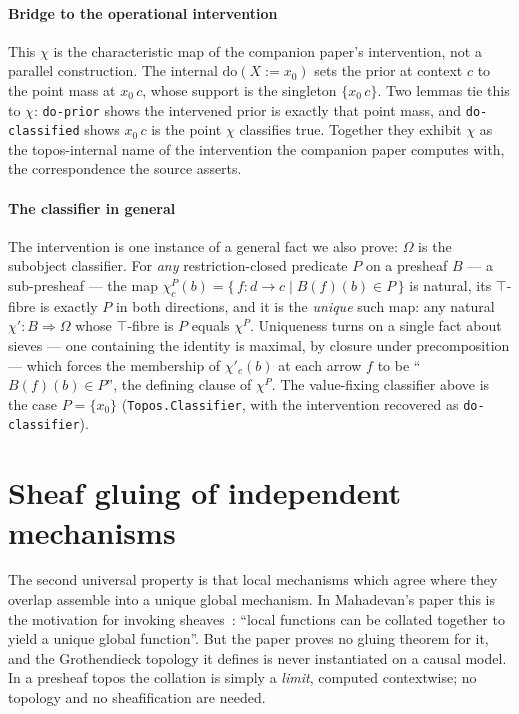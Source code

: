 \documentclass{lmcs}
\newcommand{\Om}{\Omega}
\newcommand{\dom}[2]{\mathrm{do}(#1\!:=\!#2)}
\begin{document}
\paragraph{Bridge to the operational intervention}
This $\chi$ is the characteristic map of the companion paper's intervention, not a parallel construction.
The internal $\dom{X}{x_0}$ sets the prior at context $c$ to the point mass at $x_0\,c$, whose support is the singleton $\{x_0\,c\}$.
Two lemmas tie this to $\chi$: \texttt{do-prior} shows the intervened prior is exactly that point mass, and \texttt{do-classified} shows $x_0\,c$ is the point $\chi$ classifies true.
Together they exhibit $\chi$ as the topos-internal name of the intervention the companion paper computes with, the correspondence the source asserts.

\paragraph{The classifier in general}
The intervention is one instance of a general fact we also prove: $\Om$ is the subobject classifier.
For \emph{any} restriction-closed predicate $P$ on a presheaf $B$ --- a sub-presheaf --- the map $\chi^P_c(b) = \{\, f : d \to c \mid B(f)(b) \in P \,\}$ is natural, its $\top$-fibre is exactly $P$ in both directions, and it is the \emph{unique} such map: any natural $\chi' : B \Rightarrow \Om$ whose $\top$-fibre is $P$ equals $\chi^P$.
Uniqueness turns on a single fact about sieves --- one containing the identity is maximal, by closure under precomposition --- which forces the membership of $\chi'_c(b)$ at each arrow $f$ to be ``$B(f)(b) \in P$'', the defining clause of $\chi^P$.
The value-fixing classifier above is the case $P = \{x_0\}$ (\texttt{Topos.Classifier}, with the intervention recovered as \texttt{do-classifier}).

\section{Sheaf gluing of independent mechanisms}\label{sec:gluing}

The second universal property is that local mechanisms which agree where they overlap assemble into a unique global mechanism.
In Mahadevan's paper this is the motivation for invoking sheaves~\cite[\S6]{mahadevan-2025c}: ``local functions can be collated together to yield a unique global function''.
But the paper proves no gluing theorem for it, and the Grothendieck topology it defines is never instantiated on a causal model.
In a presheaf topos the collation is simply a \emph{limit}, computed contextwise; no topology and no sheafification are needed.
\end{document}
